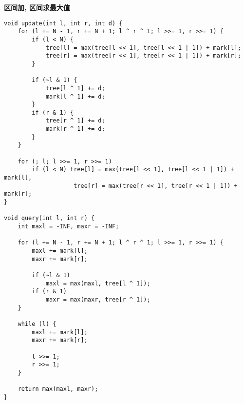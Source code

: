 \textbf{区间加, 区间求最大值}
\begin{verbatim}
void update(int l, int r, int d) {
	for (l += N - 1, r += N + 1; l ^ r ^ 1; l >>= 1, r >>= 1) {
		if (l < N) {
			tree[l] = max(tree[l << 1], tree[l << 1 | 1]) + mark[l];
			tree[r] = max(tree[r << 1], tree[r << 1 | 1]) + mark[r];
		}

		if (~l & 1) {
			tree[l ^ 1] += d;
			mark[l ^ 1] += d;
		}
		if (r & 1) {
			tree[r ^ 1] += d;
			mark[r ^ 1] += d;
		}
	}

	for (; l; l >>= 1, r >>= 1)
		if (l < N) tree[l] = max(tree[l << 1], tree[l << 1 | 1]) + mark[l],
					tree[r] = max(tree[r << 1], tree[r << 1 | 1]) + mark[r];
}

void query(int l, int r) {
	int maxl = -INF, maxr = -INF;

	for (l += N - 1, r += N + 1; l ^ r ^ 1; l >>= 1, r >>= 1) {
		maxl += mark[l];
		maxr += mark[r];

		if (~l & 1)
			maxl = max(maxl, tree[l ^ 1]);
		if (r & 1)
			maxr = max(maxr, tree[r ^ 1]);
	}

	while (l) {
		maxl += mark[l];
		maxr += mark[r];

		l >>= 1;
		r >>= 1;
	}
	
	return max(maxl, maxr);
}
\end{verbatim}